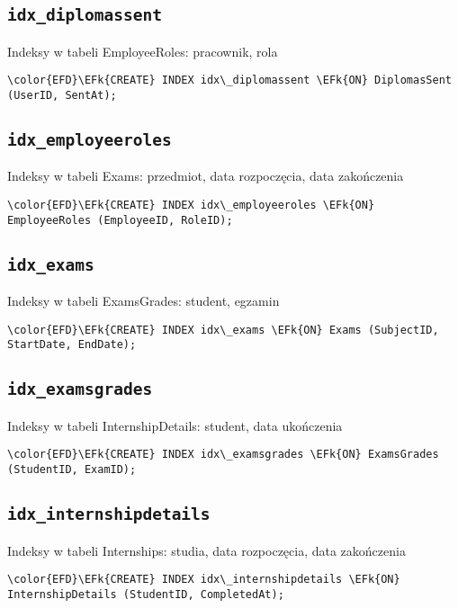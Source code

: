 \documentclass[11pt]{article}
\newcommand{\EFk}[1]{\textcolor{EFk}{\textbf{#1}}} %
\begin{document}
\subsection{\texttt{idx\_diplomassent}}
\label{sec:orgd630a4a}
Indeksy w tabeli EmployeeRoles: pracownik, rola
\begin{Code}
\begin{Verbatim}
\color{EFD}\EFk{CREATE} INDEX idx\_diplomassent \EFk{ON} DiplomasSent (UserID, SentAt);
\end{Verbatim}
\end{Code}
\subsection{\texttt{idx\_employeeroles}}
\label{sec:org06d784c}
Indeksy w tabeli Exams: przedmiot, data rozpoczęcia, data zakończenia
\begin{Code}
\begin{Verbatim}
\color{EFD}\EFk{CREATE} INDEX idx\_employeeroles \EFk{ON} EmployeeRoles (EmployeeID, RoleID);
\end{Verbatim}
\end{Code}
\subsection{\texttt{idx\_exams}}
\label{sec:orgb553f01}
Indeksy w tabeli ExamsGrades: student, egzamin
\begin{Code}
\begin{Verbatim}
\color{EFD}\EFk{CREATE} INDEX idx\_exams \EFk{ON} Exams (SubjectID, StartDate, EndDate);
\end{Verbatim}
\end{Code}
\subsection{\texttt{idx\_examsgrades}}
\label{sec:orgf170340}
Indeksy w tabeli InternshipDetails: student, data ukończenia
\begin{Code}
\begin{Verbatim}
\color{EFD}\EFk{CREATE} INDEX idx\_examsgrades \EFk{ON} ExamsGrades (StudentID, ExamID);
\end{Verbatim}
\end{Code}
\subsection{\texttt{idx\_internshipdetails}}
\label{sec:orgb98e3e8}
Indeksy w tabeli Internships: studia, data rozpoczęcia, data zakończenia
\begin{Code}
\begin{Verbatim}
\color{EFD}\EFk{CREATE} INDEX idx\_internshipdetails \EFk{ON} InternshipDetails (StudentID, CompletedAt);
\end{Verbatim}
\end{Code}
\end{document}
